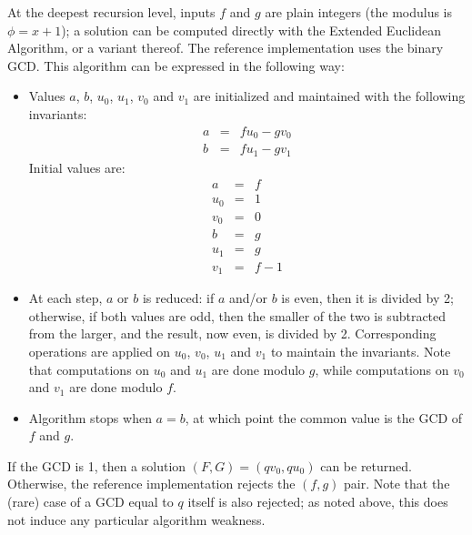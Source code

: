 At the deepest recursion level, inputs $f$ and $g$ are plain integers
(the modulus is $\phi = x+1$); a solution can be computed directly with
the Extended Euclidean Algorithm, or a variant thereof. The \falcon
reference implementation uses the binary GCD. This algorithm can be
expressed in the following way:
\begin{itemize}

  \item Values $a$, $b$, $u_0$, $u_1$, $v_0$ and $v_1$ are initialized
  and maintained with the following invariants:
  \begin{equation}
    \begin{array}{rcl}
      a &=& fu_0 - gv_0 \\
      b &=& fu_1 - gv_1
    \end{array}
  \end{equation}
  Initial values are:
  \begin{equation}
    \begin{array}{rcl}
      a &=& f \\
      u_0 &=& 1 \\
      v_0 &=& 0 \\
      b &=& g \\
      u_1 &=& g \\
      v_1 &=& f-1
    \end{array}
  \end{equation}

  \item At each step, $a$ or $b$ is reduced: if $a$ and/or $b$ is even,
  then it is divided by 2; otherwise, if both values are odd, then
  the smaller of the two is subtracted from the larger, and the result,
  now even, is divided by 2. Corresponding operations are applied on
  $u_0$, $v_0$, $u_1$ and $v_1$ to maintain the invariants. Note that
  computations on $u_0$ and $u_1$ are done modulo $g$, while computations
  on $v_0$ and $v_1$ are done modulo $f$.

  \item Algorithm stops when $a = b$, at which point the common value
  is the GCD of $f$ and $g$.

\end{itemize}

If the GCD is 1, then a solution $(F,G) = (qv_0, qu_0)$ can be returned.
Otherwise, the \falcon reference implementation rejects the $(f,g)$
pair. Note that the (rare) case of a GCD equal to $q$ itself is also
rejected; as noted above, this does not induce any particular algorithm
weakness.

